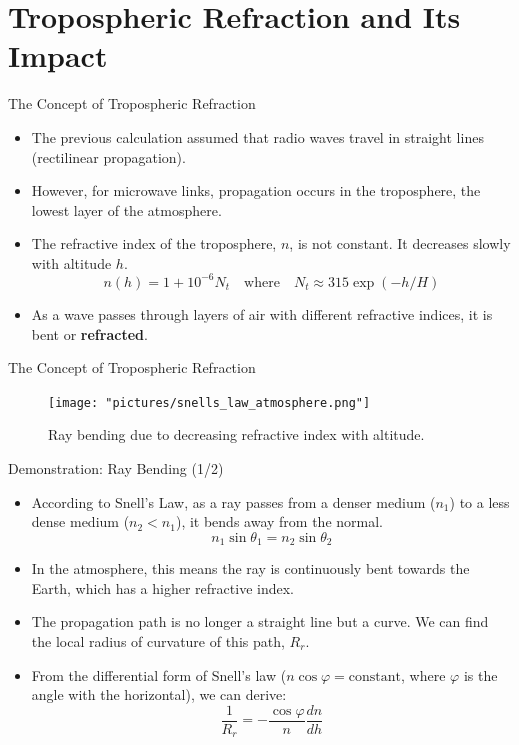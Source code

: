 \documentclass{beamer}
\begin{document}
	\section{Tropospheric Refraction and Its Impact}
	
	\begin{frame}{The Concept of Tropospheric Refraction}
		\begin{itemize}
			\item The previous calculation assumed that radio waves travel in straight lines (rectilinear propagation).
			\item However, for microwave links, propagation occurs in the troposphere, the lowest layer of the atmosphere.
			\item The refractive index of the troposphere, $n$, is not constant. It decreases slowly with altitude $h$.
			\[ n(h) = 1 + 10^{-6} N_t \quad \text{where} \quad N_t \approx 315 \exp(-h/H) \]
			\item As a wave passes through layers of air with different refractive indices, it is bent or \textbf{refracted}.
		\end{itemize}
	\end{frame}
	
	\begin{frame}{The Concept of Tropospheric Refraction}
		\begin{figure}
			\centering
			\texttt{[image: "pictures/snells\_law\_atmosphere.png"]}
			\caption{Ray bending due to decreasing refractive index with altitude.}
		\end{figure}
	\end{frame}
	
	\begin{frame}{Demonstration: Ray Bending (1/2)}
		\begin{itemize}
			\item According to Snell's Law, as a ray passes from a denser medium ($n_1$) to a less dense medium ($n_2 < n_1$), it bends away from the normal.
			\[ n_1 \sin\theta_1 = n_2 \sin\theta_2 \]
			\item In the atmosphere, this means the ray is continuously bent towards the Earth, which has a higher refractive index.
			\item The propagation path is no longer a straight line but a curve. We can find the local radius of curvature of this path, $R_r$.
			\item From the differential form of Snell's law ($n \cos\varphi = \text{constant}$, where $\varphi$ is the angle with the horizontal), we can derive:
			\[ \frac{1}{R_r} = -\frac{\cos\varphi}{n} \frac{dn}{dh} \]
		\end{itemize}
	\end{frame}
	
\end{document}
